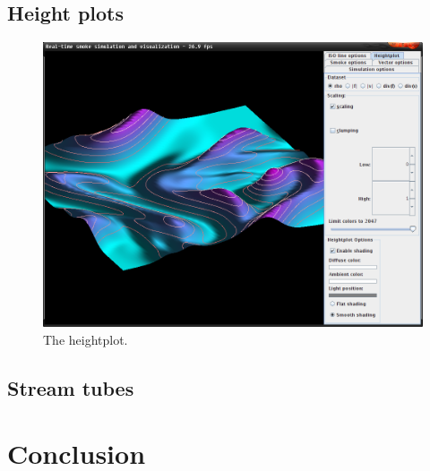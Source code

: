 \documentclass[a4paper,11pt,twoside]{report}
\begin{document}
	\section{Height plots}
		\begin{figure}[h]
		\centering
		\includegraphics[scale=\imagescalefactor]{images/step6.png}
		\caption{The heightplot.}\label{fig:step6}
		\end{figure}
		\newpage
	\section{Stream tubes}
\chapter{Conclusion}
\end{document}
